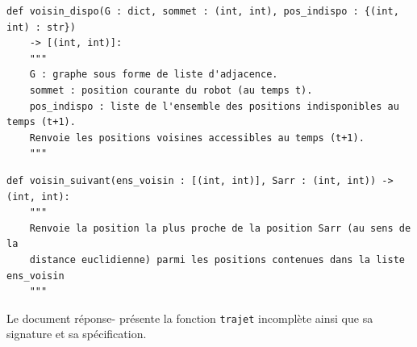 
\begin{lstlisting}
def voisin_dispo(G : dict, sommet : (int, int), pos_indispo : {(int, int) : str})
    -> [(int, int)]:
    """
    G : graphe sous forme de liste d'adjacence.
    sommet : position courante du robot (au temps t).
    pos_indispo : liste de l'ensemble des positions indisponibles au temps (t+1).
    Renvoie les positions voisines accessibles au temps (t+1).
    """
\end{lstlisting}


\begin{lstlisting}
def voisin_suivant(ens_voisin : [(int, int)], Sarr : (int, int)) -> (int, int):
    """
    Renvoie la position la plus proche de la position Sarr (au sens de la
    distance euclidienne) parmi les positions contenues dans la liste ens_voisin
    """
\end{lstlisting}

Le document réponse- présente la fonction \texttt{trajet} incomplète ainsi que sa signature et sa spécification.


%
%
%
%

